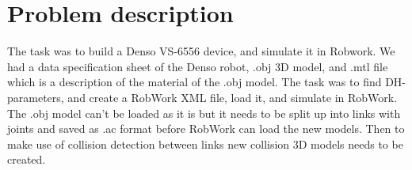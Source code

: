 \section{Problem description}
\label{sec:description}

The task was to build a Denso VS-6556 device, and simulate it in Robwork. We had a data specification sheet of the Denso robot, .obj 3D model, and .mtl file which is a description of the material of the .obj model. The task was to find DH-parameters, and create a RobWork XML file, load it,
and simulate in RobWork. The .obj model can't be loaded as it is but it needs to be split up into links with joints and saved as .ac format before RobWork can load the new models. Then to make use of collision detection between links new collision 3D models needs to be created. 
